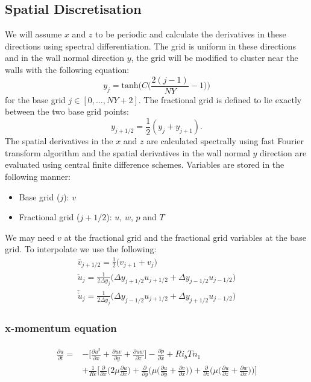 \documentclass[preprint,12pt]{article}
\begin{document}
 \subsection{Spatial Discretisation}
We will assume $x$ and $z$ to be periodic and calculate the derivatives in these directions using spectral differentiation. The grid is uniform in these directions and in the wall normal direction $y$, the grid will be modified to cluster near the walls with the following equation:
\begin{equation}
y_j=\text{tanh}\Bigg(C\Big(\frac{2(j-1)}{NY}-1\Big)\Bigg)
\end{equation}
for the base grid $j\in[0,\dots, NY+2]$. The fractional grid is defined to lie exactly between the two base grid points:
\begin{equation}
y_{j+1/2}=\frac{1}{2}(y_j+y_{j+1}).
\end{equation}
The spatial derivatives in the $x$ and $z$ are calculated spectrally using fast Fourier transform algorithm and the spatial derivatives in the wall normal $y$ direction are evaluated using central finite difference schemes. Variables are stored in the following manner:
\begin{itemize}
	\item Base grid ($j$): $v$
	\item Fractional grid ($j+1/2$): $u$, $w$, $p$ and $T$ 
\end{itemize}
We may need $v$ at the fractional grid and the fractional grid variables at the base grid. To interpolate we use the following:
 \begin{subequations}\begin{align}
 \bar{v}_{j+1/2}=\frac{1}{2}\big(v_{j+1}+v_j\big)\\
 \check{u}_j=\frac{1}{2\Delta y_j}\big(\Delta y_{j+1/2}u_{j+1/2}+\Delta y_{j-1/2}u_{j-1/2}\big)\\ 	\check{\check{u}}_j=\frac{1}{2\Delta y_j}\big(\Delta y_{j-1/2}u_{j+1/2}+\Delta y_{j+1/2}u_{j-1/2}\big)
\end{align}\end{subequations} 	
\subsubsection{x-momentum equation}
\begin{align}	\begin{split}
\frac{\partial u}{\partial t}=&-\Bigg[\frac{\partial u^2}{\partial x}+\frac{\partial uv}{\partial y}+\frac{\partial uw}{\partial z}\Bigg]-\frac{\partial p}{\partial x}+Ri_bT n_1\\&+\frac{1}{Re}\Bigg[\frac{\partial }{\partial x}\Bigg(2\mu\frac{\partial u}{\partial x}\Bigg)+\frac{\partial }{\partial y}\Bigg(\mu\Big(\frac{\partial u}{\partial y}+\frac{\partial v}{\partial x}\Big)\Bigg)+\frac{\partial }{\partial z}\Bigg(\mu\Big(\frac{\partial u}{\partial z}+\frac{\partial w}{\partial x}\Big)\Bigg)\Bigg]
\end{split}	\end{align}
\end{document}
